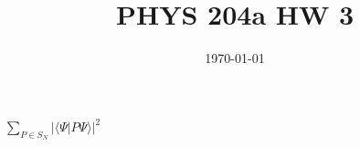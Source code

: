 \documentclass[12pt]{article}
\title{\vspace{-3em}PHYS 204a HW 3}
\date{\today}
\begin{document}
\maketitle
$\sum_{P\in S_N} |\langle \Psi|P \Psi \rangle|^2$
\end{document}
